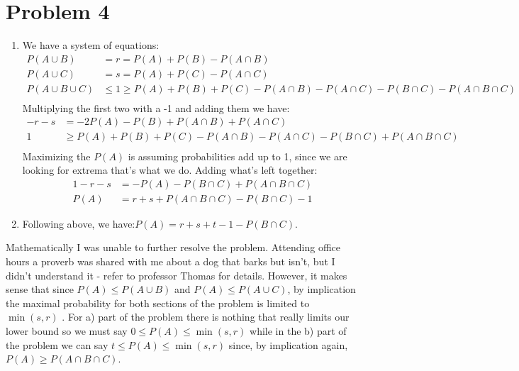 \documentclass{article}
\newcommand{\1}{\mathbf{1}}
\begin{document}
\newpage
\section*{Problem 4}
\begin{enumerate} 
    \item We have a system of equations:
    \begin{align*}
    P(A\cup B) &= r = P(A) + P(B) - P(A\cap B) \\
    P(A\cup C) &= s = P(A) + P(C) - P(A\cap C) \\
    P(A\cup B\cup C) &\leq 1 \geq P(A) + P(B) + P(C) - P(A\cap B) - P(A\cap C) - P(B \cap C) - P(A\cap B \cap C) \\
    \end{align*}
    Multiplying the first two with a -1 and adding them we have:
    \begin{align*}
    -r - s &= -2P(A) - P(B) + P(A\cap B) + P(A\cap C) \\
    1 &\geq P(A) + P(B) + P(C) - P(A\cap B) - P(A\cap C) - P(B \cap C) + P(A\cap B \cap C) \\
    \end{align*}
    Maximizing the $P(A)$ is assuming probabilities add up to 1, since we are looking for extrema that's what we do. Adding what's left together:
    \begin{align*}
    1-r-s &= -P(A) - P(B \cap C) + P(A\cap B \cap C) \\
    P(A) &= r + s + P(A\cap B \cap C) - P(B \cap C) - 1
    \end{align*}
    \item Following above, we have:$ P(A) = r + s + t -1 - P(B \cap C)$.
\end{enumerate}

Mathematically I was unable to further resolve the problem. Attending office hours a proverb was shared with me about a dog that barks but isn't, but I didn't understand it - refer to professor Thomas for details. However, it makes sense that since  $P(A) \leq P(A\cup B)$ and $P(A) \leq P(A\cup C)$, by implication the maximal probability for both sections of the problem is limited to $\min{(s, r)}$ . For a) part of the problem there is nothing that really limits our lower bound so we must say $0 \leq P(A) \leq \min{(s, r)}$ while in the b) part of the problem we can say $t \leq P(A) \leq \min{(s, r)}$ since, by implication again, $P(A)\geq P(A\cap B\cap C)$.

\newpage
\end{document}
